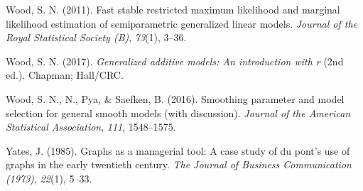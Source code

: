 \documentclass[print]{nuthesis}
\newlength{\cslhangindent}
\newenvironment{CSLReferences}%
{\setlength{\parindent}{0pt}%
\everypar{\setlength{\hangindent}{\cslhangindent}}\ignorespaces}%
{\par}
\begin{document}
\begin{CSLReferences}{1}{0}
\leavevmode{}%
Wood, S. N. (2011). Fast stable restricted maximum likelihood and marginal likelihood estimation of semiparametric generalized linear models. \emph{Journal of the Royal Statistical Society (B)}, \emph{73}(1), 3--36.

\leavevmode{}%
Wood, S. N. (2017). \emph{Generalized additive models: An introduction with r} (2nd ed.). Chapman; Hall/CRC.

\leavevmode{}%
Wood, S. N., N., Pya, \& Saefken, B. (2016). Smoothing parameter and model selection for general smooth models (with discussion). \emph{Journal of the American Statistical Association}, \emph{111}, 1548--1575.

\leavevmode{}%
Yates, J. (1985). Graphs as a managerial tool: A case study of du pont's use of graphs in the early twentieth century. \emph{The Journal of Business Communication (1973)}, \emph{22}(1), 5--33.

\end{CSLReferences}


\backmatter

% 






\end{document}
